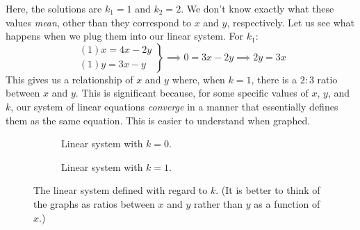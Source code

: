 \documentclass[12pt]{article}
\begin{document}
	Here, the solutions are $k_1 = 1$ and $k_2 = 2$.
	We don't know exactly what these values \textit{mean}, other than they correspond to $x$ and $y$, respectively.
	Let us see what happens when we plug them into our linear system.
	For $k_1$:
	\begin{equation*}
		\left. \begin{array}{l}
			(1)x = 4x - 2y \\
			(1)y = 3x - y
		\end{array} \right \}
		\implies 0 = 3x - 2y \implies 2y = 3x
	\end{equation*}
	This gives us a relationship of $x$ and $y$ where, when $k = 1$, there is a 
	$2 : 3$ ratio between $x$ and $y$.
	This is significant because, for some specific values of $x$, $y$, and $k$, our system of linear equations \textit{converge} in a manner that essentially defines them as the same equation.
	This is easier to understand when graphed.
	\begin{figure}[h!]
		\centering
		\captionsetup[subfigure]{justification=centering}
		\begin{subfigure}[b]{0.4\textwidth}
			\centering
			\caption{\small Linear system with $k = 0$.}
			\label{fig:sample-eigens0}
		\end{subfigure}
		\qquad
		\begin{subfigure}[b]{0.4\textwidth}
			\centering
		\caption{\small Linear system with $k = 1$.}
		\label{fig:sample-eigens1}
		\end{subfigure}
		\caption{The linear system defined with regard to $k$. (It is better to think of the graphs as ratios between $x$ and $y$ rather than $y$ as a function of $x$.)}
		\label{fig:sample-eigens}
	\end{figure}
\end{document}
